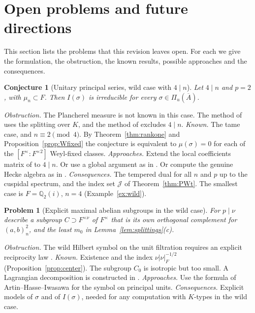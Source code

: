 \documentclass[12pt,letterpaper]{article}
\numberwithin{equation}{section}
\newtheorem{conjecture}[theorem]{Conjecture}
\newtheorem{problem}[theorem]{Problem}
\theoremstyle{definition}
\newcommand{\Q}{\mathbb Q}
\newcommand{\bA}{\overline{A}}
\begin{document}
\section{Open problems and future directions}\label{sec:open}

This section lists the problems that this revision leaves open.  For each we give the
formulation, the obstruction, the known results, possible approaches and the consequences.

\begin{conjecture}[Unitary principal series, wild case with $4\mid n$]\label{conj:wild4}
Let $4\mid n$ and $p=2$, with $\mu_n\subset F$.  Then $I(\sigma)$ is irreducible for every
$\sigma\in\Pi_u(\bA)$.
\end{conjecture}
\emph{Obstruction.}  The Plancherel measure is not known in this case.  The method of
\cite{GS16} uses the splitting over $K$, and the method of \cite{Sz19} excludes $4\mid n$.
\emph{Known.}  The tame case, and $n\equiv2\pmod4$.  By Theorem~\ref{thm:rankone} and
Proposition~\ref{prop:Wfixed} the conjecture is equivalent to $\mu(\sigma)=0$ for each of
the $[F^\times:F^{\times2}]$ Weyl-fixed classes.  \emph{Approaches.}  Extend the local
coefficients matrix of \cite{Sz19} to $4\mid n$.  Or use a global argument as in
\cite[Theorem~5.7]{Sz19}.  Or compute the genuine Hecke algebra as in \cite{Ka21}.
\emph{Consequences.}  The tempered dual for all $n$ and $p$ up to the cuspidal spectrum,
and the index set $\mathcal J$ of Theorem~\ref{thm:PWt}.  The smallest case is $F=\Q_2(i)$,
$n=4$ (Example~\ref{ex:wild}).

\begin{problem}[Explicit maximal abelian subgroups in the wild case]\label{prob:lagrangian}
For $p\mid\nu$ describe a subgroup $C\supset F^{\times\nu}$ of $F^\times$ that is its own
orthogonal complement for $(a,b)_n^2$, and the least $m_0$ in
Lemma~\ref{lem:splittings}(c).
\end{problem}
\emph{Obstruction.}  The wild Hilbert symbol on the unit filtration requires an explicit
reciprocity law \cite{Se81}.  \emph{Known.}  Existence and the index
$\nu|\nu|_F^{-1/2}$ (Proposition~\ref{prop:center}).  The subgroup $C_0$ is isotropic but
too small.  A Lagrangian decomposition is constructed in \cite[Lemma~2.3]{Sz19}.
\emph{Approaches.}  Use the formula of Artin--Hasse--Iwasawa for the symbol on principal
units.  \emph{Consequences.}  Explicit models of $\sigma$ and of $I(\sigma)$, needed for any
computation with $K$-types in the wild case.
\end{document}
